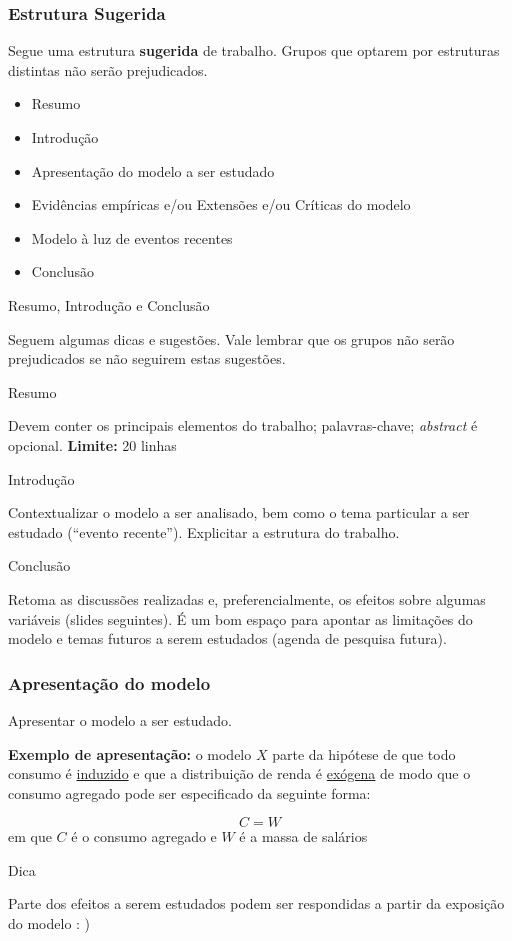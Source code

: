 \documentclass[11pt]{beamer}
\begin{document}
\begin{frame}
\frametitle{Estrutura Sugerida}

Segue uma estrutura \textbf{sugerida} de trabalho. Grupos que optarem por estruturas distintas não serão prejudicados.

\begin{itemize}
	\item Resumo 
	\item Introdução
	\item Apresentação do modelo a ser estudado
	\item Evidências empíricas e/ou Extensões e/ou Críticas do modelo
	\item Modelo à luz de eventos recentes
	\item Conclusão
\end{itemize}
\end{frame}


\begin{frame}{Resumo, Introdução e Conclusão}

Seguem algumas dicas e sugestões. Vale lembrar que os grupos não serão prejudicados se não seguirem estas sugestões.

\begin{alert}{Resumo}

Devem conter os principais elementos do trabalho; palavras-chave; \textit{abstract} é opcional. \textbf{Limite:} 20 linhas
\end{alert}

\begin{alert}{Introdução}

Contextualizar o modelo a ser analisado, bem como o tema particular a ser estudado (``evento recente''). Explicitar a estrutura do trabalho.
\end{alert}

\begin{alert}{Conclusão}
	
Retoma as discussões realizadas e, preferencialmente, os efeitos sobre algumas variáveis (slides seguintes). É um bom espaço para apontar as limitações do modelo e temas futuros a serem estudados (agenda de pesquisa futura).
\end{alert}

\end{frame}


\begin{frame}
\frametitle{Apresentação do modelo}
Apresentar o modelo a ser estudado. 

\textbf{Exemplo de apresentação:} o modelo $X$ parte da hipótese de que todo consumo é \underline{induzido} e que a distribuição de renda é \underline{exógena} de modo que o consumo agregado pode ser especificado da seguinte forma:

$$
C = W
$$
em que $C$ é o consumo agregado e $W$ é a massa de salários

\begin{alertblock}{Dica}

Parte dos efeitos a serem estudados podem ser respondidas a partir da exposição do modelo : )
\end{alertblock}
\end{frame}
\end{document}
